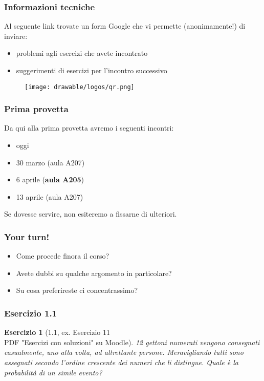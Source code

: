 \documentclass[handout]{beamer}
\newtheorem{exercise}{Esercizio}
\begin{document}
\begin{frame}[fragile]
	\frametitle{Informazioni tecniche}
	
	Al seguente link trovate un form Google che vi permette (anonimamente!) di inviare:
	
	\begin{itemize}
	    \item problemi agli esercizi che avete incontrato
	    \item suggerimenti di esercizi per l'incontro successivo
	\end{itemize}
	
	\begin{figure}
	    \centering
	    \texttt{[image: drawable/logos/qr.png]}
	\end{figure}
    
\end{frame} 

\begin{frame}[fragile]
	\frametitle{Prima provetta}
	
	Da qui alla prima provetta avremo i seguenti incontri:
	
	\begin{itemize}
	    \item oggi
	    \item 30 marzo (aula A207)
	    \item 6 aprile (\textbf{aula A205})
	    \item 13 aprile (aula A207)
	\end{itemize}
	
	\medskip
	
	Se dovesse servire, non esiteremo a fissarne di ulteriori.
	
    
\end{frame} 

\begin{frame}[fragile]
	\frametitle{Your turn!}
	
	\begin{itemize}
	    \item Come procede finora il corso?
	    \item Avete dubbi su qualche argomento in particolare?
	    \item Su cosa preferireste ci concentrassimo?
	\end{itemize}
    
\end{frame} 

\begin{frame}[fragile]
	\frametitle{Esercizio 1.1}
	
	\begin{exercise}[1.1, ex. Esercizio 11\\PDF "Esercizi con soluzioni" su Moodle]
	12 gettoni numerati vengono consegnati casualmente, uno alla volta, ad altrettante persone. Meravigliando tutti sono assegnati secondo l'ordine crescente dei numeri che li distingue. Quale è la probabilità di un simile evento?
    \end{exercise}
\end{frame}
\end{document}
